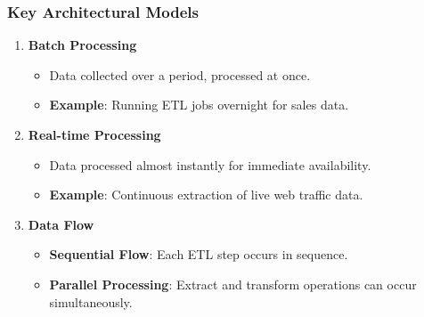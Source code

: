 \documentclass[aspectratio=169]{beamer}
\begin{document}
\begin{frame}[fragile]
    \frametitle{Key Architectural Models}
    \begin{enumerate}
        \item \textbf{Batch Processing}
        \begin{itemize}
            \item Data collected over a period, processed at once.
            \item \textbf{Example}: Running ETL jobs overnight for sales data.
        \end{itemize}

        \item \textbf{Real-time Processing}
        \begin{itemize}
            \item Data processed almost instantly for immediate availability.
            \item \textbf{Example}: Continuous extraction of live web traffic data.
        \end{itemize}

        \item \textbf{Data Flow}
        \begin{itemize}
            \item \textbf{Sequential Flow}: Each ETL step occurs in sequence.
            \item \textbf{Parallel Processing}: Extract and transform operations can occur simultaneously.
        \end{itemize}
    \end{enumerate}
\end{frame}
\end{document}

